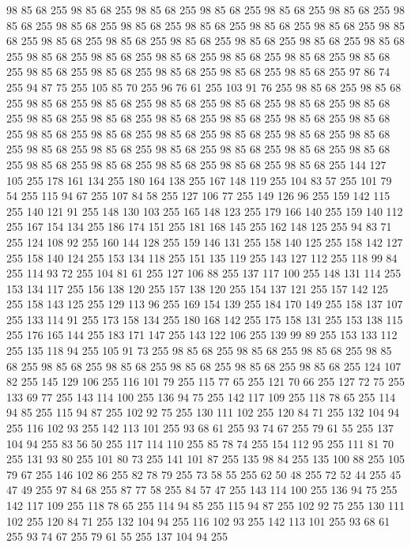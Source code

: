 98 85 68 255 98 85 68 255 98 85 68 255 98 85 68 255 98 85 68 255 98 85 68 255 98 85 68 255 98 85 68 255 98 85 68 255 98 85 68 255 98 85 68 255 98 85 68 255 98 85 68 255 98 85 68 255 98 85 68 255 98 85 68 255 98 85 68 255 98 85 68 255 98 85 68 255 98 85 68 255 98 85 68 255 98 85 68 255 98 85 68 255 98 85 68 255 98 85 68 255 98 85 68 255 98 85 68 255 98 85 68 255 98 85 68 255 98 85 68 255 97 86 74 255 94 87 75 255 105 85 70 255 96 76 61 255 103 91 76 255 98 85 68 255 98 85 68 255 98 85 68 255 98 85 68 255 98 85 68 255 98 85 68 255 98 85 68 255 98 85 68 255 98 85 68 255 98 85 68 255 98 85 68 255 98 85 68 255 98 85 68 255 98 85 68 255 98 85 68 255 98 85 68 255 98 85 68 255 98 85 68 255 98 85 68 255 98 85 68 255 98 85 68 255 98 85 68 255 98 85 68 255 98 85 68 255 98 85 68 255 98 85 68 255 98 85 68 255 98 85 68 255 98 85 68 255
98 85 68 255 98 85 68 255 144 127 105 255 178 161 134 255 180 164 138 255 167 148 119 255 104 83 57 255 101 79 54 255 115 94 67 255 107 84 58 255 127 106 77 255 149 126 96 255 159 142 115 255 140 121 91 255 148 130 103 255 165 148 123 255 179 166 140 255 159 140 112 255 167 154 134 255 186 174 151 255 181 168 145 255 162 148 125 255 94 83 71 255 124 108 92 255 160 144 128 255 159 146 131 255 158 140 125 255 158 142 127 255 158 140 124 255 153 134 118 255 151 135 119 255 143 127 112 255 118 99 84 255 114 93 72 255 104 81 61 255 127 106 88 255 137 117 100 255 148 131 114 255 153 134 117 255 156 138 120 255 157 138 120 255 154 137 121 255 157 142 125 255 158 143 125 255 129 113 96 255 169 154 139 255 184 170 149 255 158 137 107 255 133 114 91 255 173 158 134 255 180 168 142 255 175 158 131 255 153 138 115 255 176 165 144 255 183 171 147 255 143 122 106 255 139 99 89 255 153 133 112 255 135 118 94 255 105 91 73 255 98 85 68 255 98 85 68 255 98 85 68 255 98 85 68 255
98 85 68 255 98 85 68 255 98 85 68 255 98 85 68 255 98 85 68 255 124 107 82 255 145 129 106 255 116 101 79 255 115 77 65 255 121 70 66 255 127 72 75 255 133 69 77 255 143 114 100 255 136 94 75 255 142 117 109 255 118 78 65 255 114 94 85 255 115 94 87 255 102 92 75 255 130 111 102 255 120 84 71 255 132 104 94 255 116 102 93 255 142 113 101 255 93 68 61 255 93 74 67 255 79 61 55 255 137 104 94 255 83 56 50 255 117 114 110 255 85 78 74 255 154 112 95 255 111 81 70 255 131 93 80 255 101 80 73 255 141 101 87 255 135 98 84 255 135 100 88 255 105 79 67 255 146 102 86 255 82 78 79 255 73 58 55 255 62 50 48 255 72 52 44 255 45 47 49 255 97 84 68 255 87 77 58 255 84 57 47 255 143 114 100 255 136 94 75 255 142 117 109 255 118 78 65 255 114 94 85 255 115 94 87 255 102 92 75 255 130 111 102 255 120 84 71 255 132 104 94 255 116 102 93 255 142 113 101 255 93 68 61 255 93 74 67 255 79 61 55 255 137 104 94 255
